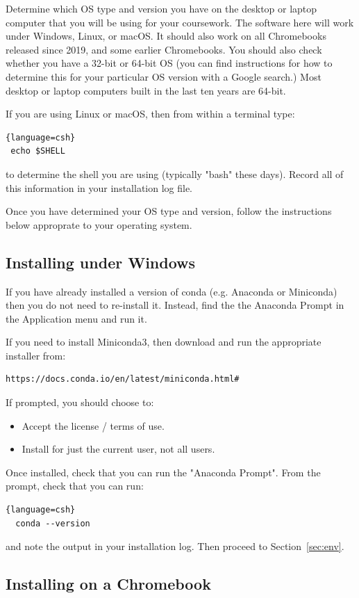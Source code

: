 Determine which OS type and version you have on the desktop or laptop
computer that you will be using for your coursework.  The software
here will work under Windows, Linux, or macOS.  It should also work on
all Chromebooks released since 2019, and some earlier Chromebooks.
You should also check whether you have a 32-bit or 64-bit OS (you can
find instructions for how to determine this for your particular OS
version with a Google search.)  Most desktop or laptop computers built
in the last ten years are 64-bit.

If you are using Linux or macOS, then from within a terminal type:
\begin{lstlisting}{language=csh}
 echo $SHELL
\end{lstlisting}
to determine the shell you are using (typically "bash" these days).
Record all of this information in your installation log file.

Once you have determined your OS type and version, follow the
instructions below approprate to your operating system.

\subsection{Installing under Windows}

If you have already installed a version of conda (e.g. Anaconda or
Miniconda) then you do not need to re-install it.  Instead, find the
the Anaconda Prompt in the Application menu and run it.

If you need to install Miniconda3, then download and run the
appropriate installer from:
\begin{verbatim}
https://docs.conda.io/en/latest/miniconda.html#
\end{verbatim}
If prompted, you should choose to:
\begin{itemize}
 \item Accept the license / terms of use.
 \item Install for just the current user, not all users.
\end{itemize}
 Once installed, check that you can run the "Anaconda Prompt". From
the prompt, check that you can run:
\begin{lstlisting}{language=csh}
  conda --version
\end{lstlisting}
and note the output in your installation log.  Then proceed to
Section~\ref{sec:env}.

\subsection{Installing on a Chromebook}

